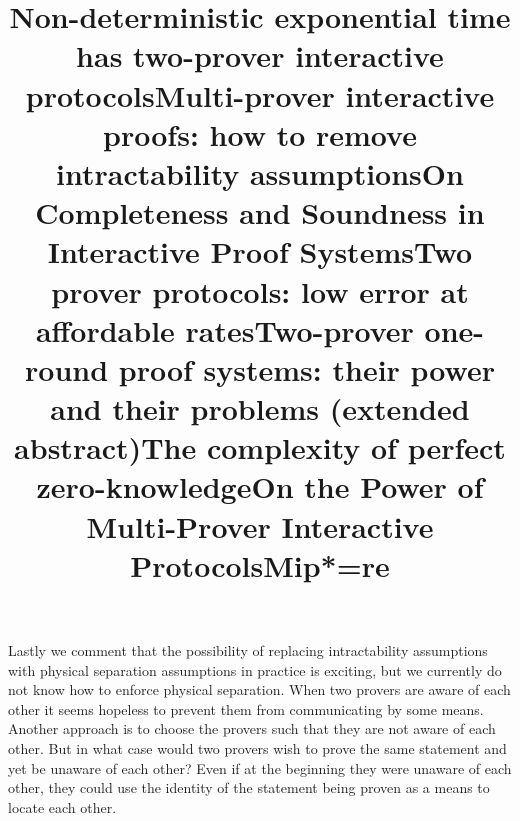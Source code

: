 Lastly we comment that the possibility of replacing intractability assumptions with physical separation assumptions in practice is exciting, but we currently do not know how to enforce physical separation.
When two provers are aware of each other it seems hopeless to prevent them from communicating by some means.
Another approach is to choose the provers such that they are not aware of each other.
But in what case would two provers wish to prove the same statement and yet be unaware of each other?
Even if at the beginning they were unaware of each other, they could use the identity of the statement being proven as a means to locate each other.

\begin{references}
    \title{Non-deterministic exponential time has two-prover interactive protocols}

    \title{Multi-prover interactive proofs: how to remove intractability assumptions}

    \title{On Completeness and Soundness in Interactive Proof Systems}

    \title{Two prover protocols: low error at affordable rates}

    \title{Two-prover one-round proof systems: their power and their problems (extended abstract)}

    \title{The complexity of perfect zero-knowledge}

    \title{On the Power of Multi-Prover Interactive Protocols}

    \title{Mip*=re}
\end{references}